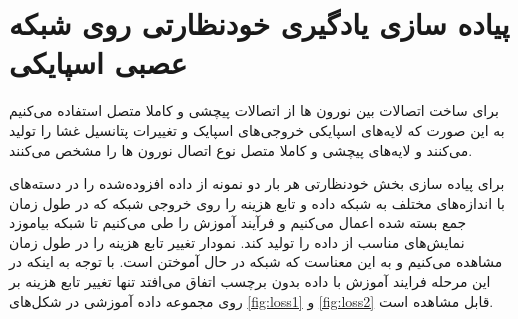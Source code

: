 \section{پیاده سازی یادگیری خودنظارتی روی شبکه عصبی اسپایکی}
برای ساخت اتصالات بین نورون ها از اتصالات پیچشی و کاملا متصل استفاده می‌کنیم به این صورت که لایه‌های اسپایکی خروجی‌های اسپایک و تغییرات پتانسیل غشا را تولید می‌کنند و لایه‌های پیچشی و کاملا متصل نوع اتصال نورون ها را مشخص می‌کنند.
%
%
%
%
%
%
%
%
%
%
%
%
%

برای پیاده سازی بخش خودنظارتی هر بار دو نمونه از داده افزوده‌شده را در دسته‌های با اندازه‌های مختلف به شبکه داده و تابع هزینه را روی خروجی شبکه که در طول زمان جمع بسته شده اعمال می‌کنیم و فرآیند آموزش را طی می‌کنیم تا شبکه بیاموزد نمایش‌های مناسب از داده را تولید کند. نمودار تغییر تابع هزینه را در طول زمان مشاهده می‌کنیم و به این معناست که شبکه در حال آموختن است. با توجه به اینکه در این مرحله فرایند آموزش با داده بدون برچسب اتفاق می‌افتد تنها تغییر تابع هزینه بر روی مجموعه داده آموزشی  در شکل‌های  \ref{fig:loss1} و  \ref{fig:loss2}  قابل مشاهده است.


